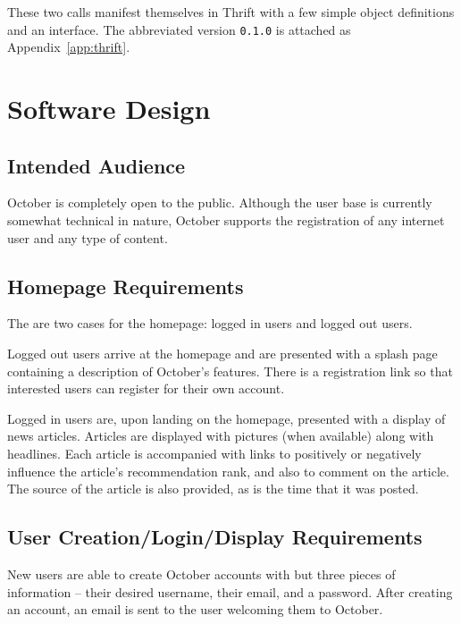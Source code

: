 \documentclass[11pt,letterpaper]{article}
\begin{document}
These two calls manifest themselves in Thrift with a few simple object
definitions and an interface.  The abbreviated version \texttt{0.1.0} is
attached as Appendix~\ref{app:thrift}.

\section{Software Design}

\subsection{Intended Audience}
October is completely open to the public.
Although the user base is currently somewhat technical in nature, October supports the registration of any internet user and any type of content. 

\subsection{Homepage Requirements}
The are two cases for the homepage: logged in users and logged out users.

Logged out users arrive at the homepage and are presented with a splash page containing a description of October's features.
There is a registration link so that interested users can register for their own account.

Logged in users are, upon landing on the homepage, presented with a display of news articles.
Articles are displayed with pictures (when available) along with headlines.
Each article is accompanied with links to positively or negatively influence the article's recommendation rank, and also to comment on the article. 
The source of the article is also provided, as is the time that it was posted. 

\subsection{User Creation/Login/Display Requirements}
New users are able to create October accounts with but three pieces of information --  their desired username, their email, and a password.
After creating an account, an email is sent to the user welcoming them to October.
\end{document}
